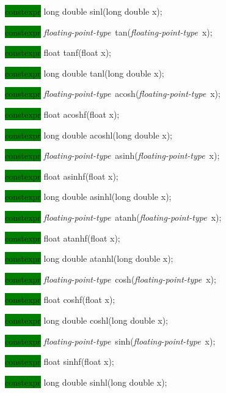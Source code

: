 \documentclass[prd,twocolumn,amsmath,amssymb,nofootinbib,eqsecnum]{revtex4-1}
\newcommand{\highlight}[1]{\colorbox{green}{\!\!\!\! #1}}
\newcommand{\fptype}{{\it floating-point-type}}
\begin{document}
{\highlight{constexpr} long double sinl(long double x);

\vspace{2ex}


\highlight{constexpr} \fptype\ tan(\fptype\ x);

\highlight{constexpr} float tanf(float x);

\highlight{constexpr} long double tanl(long double x);

\vspace{2ex}


\highlight{constexpr} \fptype\ acosh(\fptype\ x);

\highlight{constexpr} float acoshf(float x);

\highlight{constexpr} long double acoshl(long double x);

\vspace{2ex}


\highlight{constexpr} \fptype\ asinh(\fptype\ x);

\highlight{constexpr} float asinhf(float x);

\highlight{constexpr} long double asinhl(long double x);

\vspace{2ex}


\highlight{constexpr} \fptype\ atanh(\fptype\ x);

\highlight{constexpr} float atanhf(float x);

\highlight{constexpr} long double atanhl(long double x);

\vspace{2ex}


\highlight{constexpr} \fptype\ cosh(\fptype\ x);

\highlight{constexpr} float coshf(float x);

\highlight{constexpr} long double coshl(long double x);

\vspace{2ex}


\highlight{constexpr} \fptype\ sinh(\fptype\ x);

\highlight{constexpr} float sinhf(float x);

\highlight{constexpr} long double sinhl(long double x);

}
\end{document}
